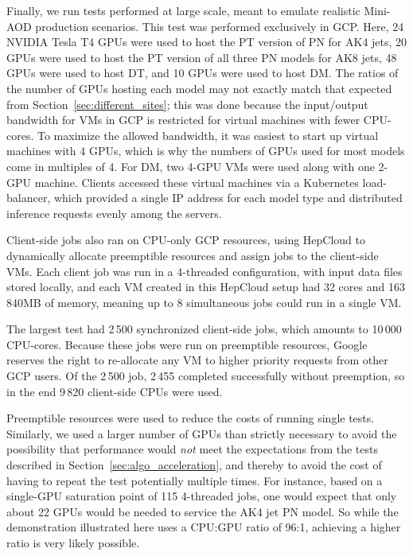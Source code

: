 Finally, we run tests performed at large scale, meant to emulate realistic Mini-AOD production scenarios. This test was performed exclusively in GCP. Here, 24 NVIDIA Tesla T4 GPUs were used to host the PT version of PN for AK4 jets, 20 GPUs were used to host the PT version of all three PN models for AK8 jets, 48 GPUs were used to host DT, and 10 GPUs were used to host DM. The ratios of the number of GPUs hosting each model may not exactly match that expected from Section~\ref{sec:different_sites}; this was done because the input/output bandwidth for VMs in GCP is restricted for virtual machines with fewer CPU-cores. To maximize the allowed bandwidth, it was easiest to start up virtual machines with 4 GPUs, which is why the numbers of GPUs used for most models come in multiples of 4. For DM, two 4-GPU VMs were used along with one 2-GPU machine. Clients accessed these virtual machines via a Kubernetes load-balancer, which provided a single IP address for each model type and distributed inference requests evenly among the servers.

Client-side jobs also ran on CPU-only GCP resources, using HepCloud to dynamically allocate preemptible resources and assign jobs to the client-side VMs. Each client job was run in a 4-threaded configuration, with input data files stored locally, and each VM created in this HepCloud setup had 32 cores and 163\,840\unit{MB} of memory, meaning up to 8 simultaneous jobs could run in a single VM.

The largest test had 2\,500 synchronized client-side jobs, which amounts to 10\,000 CPU-cores. Because these jobs were run on preemptible resources, Google reserves the right to re-allocate any VM to higher priority requests from other GCP users. Of the 2\,500 job, 2\,455 completed successfully without preemption, so in the end 9\,820 client-side CPUs were used.

Preemptible resources were used to reduce the costs of running single tests. Similarly, we used a larger number of GPUs than strictly necessary to avoid the possibility that performance would \textit{not} meet the expectations from the tests described in Section~\ref{sec:algo_acceleration}, and thereby to avoid the cost of having to repeat the test potentially multiple times. For instance, based on a single-GPU saturation point of 115 4-threaded jobs, one would expect that only about 22 GPUs would be needed to service the AK4 jet PN model. So while the demonstration illustrated here uses a CPU:GPU ratio of 96:1, achieving a higher ratio is very likely possible.

